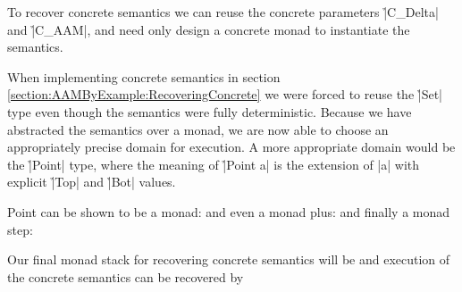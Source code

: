 To recover concrete semantics we can reuse the concrete parameters \h|C_Delta|
and \h|C_AAM|, and need only design a concrete monad to instantiate the
semantics.


When implementing concrete semantics in section
\ref{section:AAMByExample:RecoveringConcrete} we were forced to reuse the
\h|Set| type even though the semantics were fully deterministic.
%
Because we have abstracted the semantics over a monad, we are now able to
choose an appropriately precise domain for execution.
%
A more appropriate domain would be the \h|Point| type, where the meaning of
\h|Point a| is the extension of \p|a| with explicit \h|Top| and \h|Bot| values.
%


Point can be shown to be a monad:
%
%
and even a monad plus:
%
%
and finally a monad step:
%


Our final monad stack for recovering concrete semantics will be
%
%
and execution of the concrete semantics can be recovered by
%
